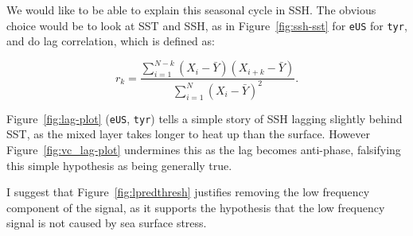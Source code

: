 



\label{sec:lag}



We would like to be able to explain this seasonal cycle in SSH.
The obvious choice would be to look at SST and SSH, as in Figure~\ref{fig:ssh-sst}
for \texttt{eUS} for \texttt{tyr}, and do lag correlation, which is defined as:

\begin{equation}
r_{k}=
\frac{\sum_{i=1}^{N-k}\left(X_{i}
-\bar{Y}\right)\left(X_{i+k}-\bar{Y}\right)}
{\sum_{i=1}^{N}\left(X_{i}
-\bar{Y}\right)^{2}}.
\end{equation}

Figure~\ref{fig:lag-plot} (\texttt{eUS}, \texttt{tyr}) tells a simple story of
SSH lagging slightly behind SST, as the mixed layer takes longer
to heat up than the surface.
However Figure~\ref{fig:vc_lag-plot} undermines this as the
lag becomes anti-phase, falsifying this simple hypothesis as 
being generally true.

I suggest that Figure~\ref{fig:lpredthresh} justifies removing the low frequency
component of the signal, as it supports the hypothesis that the
low frequency signal is not caused by sea surface stress.

\FloatBarrier
